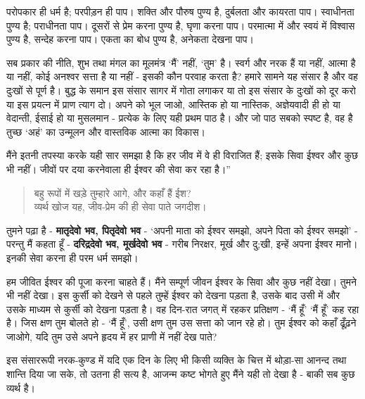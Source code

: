 \newpage

परोपकार ही धर्म है; परपीड़न ही पाप। शक्ति और पौरुष पुण्य है, दुर्बलता और कायरता पाप। स्वाधीनता पुण्य है; पराधीनता पाप। दूसरों से प्रेम करना पुण्य है, घृणा करना पाप। परमात्मा में और स्वयं में विश्वास पुण्य है, सन्देह करना पाप। एकता का बोध पुण्य है, अनेकता देखना पाप। 

सब प्रकार की नीति, शुभ तथा मंगल का मूलमंत्र ‘मैं’ नहीं, ‘तुम’ है। स्वर्ग और नरक हैं या नहीं, आत्मा है या नहीं, कोई अनश्वर सत्ता है या नहीं - इसकी कौन परवाह करता है? हमारे सामने यह संसार है और वह दुःखों से पूर्ण है। बुद्ध के समान इस संसार सागर में गोता लगाकर या तो इस संसार के दुःखों को दूर करो या इस प्रयत्न में प्राण त्याग दो। अपने को भूल जाओ, आस्तिक हो या नास्तिक, अज्ञेयवादी ही हो या वेदान्ती, ईसाई हो या मुसलमान - प्रत्येक के लिए यही प्रथम पाठ है। और जो पाठ सबको स्पष्ट है, वह है तुच्छ ‘अहं’ का उन्मूलन और वास्तविक आत्मा का विकास। 

मैंने इतनी तपस्या करके यही सार समझा है कि हर जीव में वे ही विराजित हैं; इसके सिवा ईश्वर और कुछ भी नहीं। जीवों पर दया करनेवाला ही ईश्वर की सेवा कर रहा है।”

\begin{verse}
बहु रूपों में खड़े तुम्हारे आगे, और कहाँ हैं ईश?\\व्यर्थ खोज यह, जीव-प्रेम की ही सेवा पाते जगदीश। 
\end{verse}

तुमने पढ़ा है - \textbf{मातृदेवो भव, पितृदेवो भव } - ‘अपनी माता को ईश्वर समझो, अपने पिता को ईश्वर समझो’ - परन्तु मैं कहता हूँ - \textbf{दरिद्रदेवो भव, मूर्खदेवो भव } - गरीब निरक्षर, मूर्ख और दु;खी, इन्हें अपना ईश्वर मानो। इनकी सेवा करना ही परम धर्म समझो। 

हम जीवित ईश्वर की पूजा करना चाहते हैं। मैंने सम्पूर्ण जीवन ईश्वर के सिवा और कुछ नहीं देखा। तुमने भी नहीं देखा। इस कुर्सी को देखने से पहले तुम्हें ईश्वर को देखना पड़ता है, उसके बाद उसी में और उसके माध्यम से कुर्सी को देखना पड़ता है। वह दिन-रात जगत् में रहकर प्रतिक्षण - ‘मैं हूँ’ ‘मैं हूँ’ कह रहा है। जिस क्षण तुम बोलते हो - ‘मैं हूँ’, उसी क्षण तुम उस सत्ता को जान रहे हो। तुम ईश्वर को कहाँ ढूँढ़ने जाओगे, यदि तुम उसे अपने हृदय में हर प्राणी में नहीं देख पाते? 

इस संसाररूपी नरक-कुण्ड में यदि एक दिन के लिए भी किसी व्यक्ति के चित्त में थोड़ा-सा आनन्द तथा शान्ति दिया जा सके, तो उतना ही सत्य है, आजन्म कष्ट भोगते हुए मैंने यही तो देखा है - बाकी सब कुछ व्यर्थ है। 

